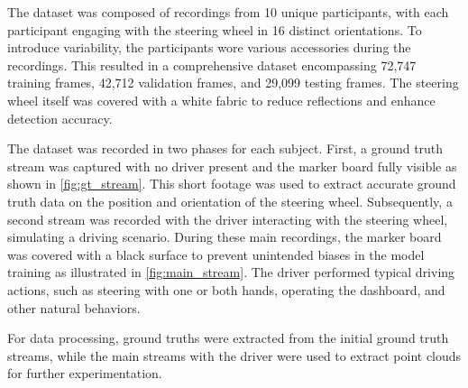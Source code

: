 The dataset was composed of recordings from 10 unique participants, 
with each participant engaging with the steering wheel in 16 distinct 
orientations. To introduce variability, the participants wore various 
accessories during the recordings. 
This resulted in a comprehensive dataset encompassing 72,747 training 
frames, 42,712 validation frames, and 29,099 testing frames. 
The steering wheel itself was covered with a white fabric to 
reduce reflections and enhance detection accuracy.

The dataset was recorded in two phases for each subject. 
First, a ground truth stream was captured with no driver 
present and the marker board fully visible as shown in \cref{fig:gt_stream}. 
This short footage was used to extract accurate ground truth data on 
the position and orientation of the steering wheel. 
Subsequently, a second stream was recorded with the driver 
interacting with the steering wheel, simulating a driving 
scenario. During these main recordings, the marker board was 
covered with a black surface to prevent unintended biases in 
the model training as illustrated in \cref{fig:main_stream}. 
The driver performed typical driving 
actions, such as steering with one or both hands, operating 
the dashboard, and other natural behaviors. 

For data processing, ground truths were extracted from the initial 
ground truth streams, while the main streams with the driver were 
used to extract point clouds for further experimentation.

